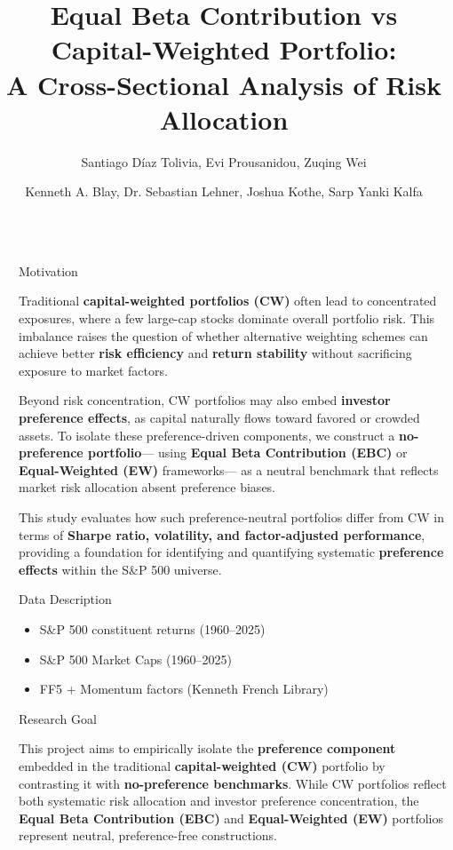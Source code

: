 \documentclass[final]{beamer}
\title{\textcolor{bured}{Equal Beta Contribution vs Capital-Weighted Portfolio:}\\ 
A Cross-Sectional Analysis of Risk Allocation}
\author{Santiago Díaz Tolivia, Evi Prousanidou, Zuqing Wei \inst{1} \and Kenneth A. Blay, Dr. Sebastian Lehner, Joshua Kothe,  Sarp Yanki Kalfa\inst{2}}
\institute[shortinst]{\inst{1} Boston University MSMFT \samelineand \inst{2} Invesco Asset Management}
\newlength{\sepwidth}
\newlength{\colwidth}
\newcommand{\separatorcolumn}{\begin{column}{\sepwidth}\end{column}}
\begin{document}
\begin{frame}[t]
\begin{columns}[t]
\separatorcolumn

\begin{column}{\colwidth}

\begin{block}{Motivation}

Traditional \textbf{capital-weighted portfolios (CW)} often lead to concentrated exposures, 
where a few large-cap stocks dominate overall portfolio risk. 
This imbalance raises the question of whether alternative weighting schemes can achieve 
better \textbf{risk efficiency} and \textbf{return stability} without sacrificing exposure to market factors.  

Beyond risk concentration, CW portfolios may also embed \textbf{investor preference effects}, 
as capital naturally flows toward favored or crowded assets. 
To isolate these preference-driven components, we construct a \textbf{no-preference portfolio}—
using \textbf{Equal Beta Contribution (EBC)} or \textbf{Equal-Weighted (EW)} frameworks—
as a neutral benchmark that reflects market risk allocation absent preference biases.  

This study evaluates how such preference-neutral portfolios differ from CW in terms of 
\textbf{Sharpe ratio, volatility, and factor-adjusted performance}, providing a foundation for 
identifying and quantifying systematic \textbf{preference effects} within the S\&P 500 universe.

\end{block}



\begin{block}{Data Description}
\begin{itemize}
  \item S\&P 500 constituent returns (1960–2025)
  \item S\&P 500 Market Caps (1960–2025)
  \item FF5 + Momentum factors (Kenneth French Library)
\end{itemize}
\end{block}

\begin{block}{Research Goal}

This project aims to empirically isolate the \textbf{preference component} embedded 
in the traditional \textbf{capital-weighted (CW)} portfolio by contrasting it with 
\textbf{no-preference benchmarks}.  
While CW portfolios reflect both systematic risk allocation and investor preference concentration, 
the \textbf{Equal Beta Contribution (EBC)} and \textbf{Equal-Weighted (EW)} portfolios represent 
neutral, preference-free constructions.  


\end{block}
\end{column}
\end{columns}
\end{frame}
\end{document}

